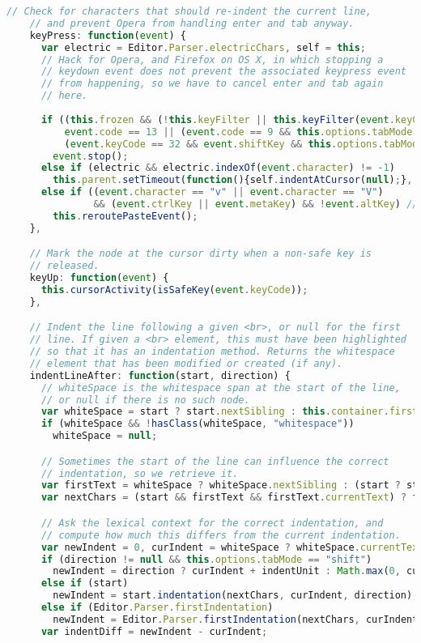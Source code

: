 \begin{lstlisting}[language=Javascript]
    // Check for characters that should re-indent the current line,
    // and prevent Opera from handling enter and tab anyway.
    keyPress: function(event) {
      var electric = Editor.Parser.electricChars, self = this;
      // Hack for Opera, and Firefox on OS X, in which stopping a
      // keydown event does not prevent the associated keypress event
      // from happening, so we have to cancel enter and tab again
      // here.
      
      if ((this.frozen && (!this.keyFilter || this.keyFilter(event.keyCode, event))) ||
          event.code == 13 || (event.code == 9 && this.options.tabMode != "default") ||
          (event.keyCode == 32 && event.shiftKey && this.options.tabMode == "default"))
        event.stop();
      else if (electric && electric.indexOf(event.character) != -1)
        this.parent.setTimeout(function(){self.indentAtCursor(null);}, 0);
      else if ((event.character == "v" || event.character == "V")
               && (event.ctrlKey || event.metaKey) && !event.altKey) // ctrl-V
        this.reroutePasteEvent();
    },

    // Mark the node at the cursor dirty when a non-safe key is
    // released.
    keyUp: function(event) {
      this.cursorActivity(isSafeKey(event.keyCode));
    },

    // Indent the line following a given <br>, or null for the first
    // line. If given a <br> element, this must have been highlighted
    // so that it has an indentation method. Returns the whitespace
    // element that has been modified or created (if any).
    indentLineAfter: function(start, direction) {
      // whiteSpace is the whitespace span at the start of the line,
      // or null if there is no such node.
      var whiteSpace = start ? start.nextSibling : this.container.firstChild;
      if (whiteSpace && !hasClass(whiteSpace, "whitespace"))
        whiteSpace = null;

      // Sometimes the start of the line can influence the correct
      // indentation, so we retrieve it.
      var firstText = whiteSpace ? whiteSpace.nextSibling : (start ? start.nextSibling : this.container.firstChild);
      var nextChars = (start && firstText && firstText.currentText) ? firstText.currentText : "";

      // Ask the lexical context for the correct indentation, and
      // compute how much this differs from the current indentation.
      var newIndent = 0, curIndent = whiteSpace ? whiteSpace.currentText.length : 0;
      if (direction != null && this.options.tabMode == "shift")
        newIndent = direction ? curIndent + indentUnit : Math.max(0, curIndent - indentUnit)
      else if (start)
        newIndent = start.indentation(nextChars, curIndent, direction);
      else if (Editor.Parser.firstIndentation)
        newIndent = Editor.Parser.firstIndentation(nextChars, curIndent, direction);
      var indentDiff = newIndent - curIndent;


\end{lstlisting}
